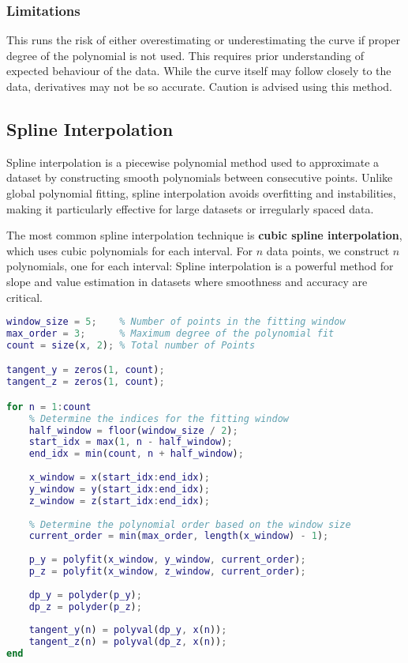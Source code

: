 \documentclass[a4paper]{article}
\begin{document}
\subsubsection{Limitations}
This runs the risk of either overestimating or underestimating the curve if proper degree of the polynomial is not used. This requires prior understanding of expected behaviour of the data. While the curve itself may follow closely to the data, derivatives may not be so accurate. Caution is advised using this method.

\hypertarget{spline-fit}{%
\subsection{Spline Interpolation}\label{Spline}}

Spline interpolation is a piecewise polynomial method used to approximate a dataset by constructing smooth polynomials between consecutive points. Unlike global polynomial fitting, spline interpolation avoids overfitting and instabilities, making it particularly effective for large datasets or irregularly spaced data.

The most common spline interpolation technique is \textbf{cubic spline interpolation}, which uses cubic polynomials for each interval. For $n$ data points, we construct $n$ polynomials, one for each interval: Spline interpolation is a powerful method for slope and value estimation in datasets where smoothness and accuracy are critical.

\begin{lstlisting}[language=matlab]
window_size = 5;    % Number of points in the fitting window
max_order = 3;      % Maximum degree of the polynomial fit
count = size(x, 2); % Total number of Points

tangent_y = zeros(1, count);
tangent_z = zeros(1, count);

for n = 1:count
    % Determine the indices for the fitting window
    half_window = floor(window_size / 2);
    start_idx = max(1, n - half_window);
    end_idx = min(count, n + half_window);
    
    x_window = x(start_idx:end_idx);
    y_window = y(start_idx:end_idx);
    z_window = z(start_idx:end_idx);
    
    % Determine the polynomial order based on the window size
    current_order = min(max_order, length(x_window) - 1);
    
    p_y = polyfit(x_window, y_window, current_order);
    p_z = polyfit(x_window, z_window, current_order);
    
    dp_y = polyder(p_y);
    dp_z = polyder(p_z);
    
    tangent_y(n) = polyval(dp_y, x(n));
    tangent_z(n) = polyval(dp_z, x(n));
end

\end{lstlisting}
\end{document}
